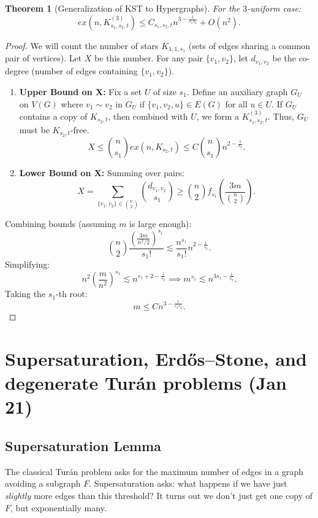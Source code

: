 \documentclass[a4paper]{article}
\newtheorem{thm}{Theorem}[section]
\begin{document}
\begin{thm}[Generalization of KST to Hypergraphs]
    For the $3$-uniform case:
    \[
    ex(n,K_{s_1,s_2,t}^{(3)}) \leq C_{s_1,s_2,t} n^{3-\frac{1}{s_1s_2}} + O(n^2).
    \]
\end{thm}
\begin{proof}
    We will count the number of stars $K_{1,1,s_1}$ (sets of edges sharing a common pair of vertices). Let $X$ be this number. For any pair $\{v_1,v_2\}$, let $d_{v_1,v_2}$ be the co-degree (number of edges containing $\{v_1,v_2\}$).
    
    \begin{enumerate}
        \item \textbf{Upper Bound on X:} Fix a set $U$ of size $s_1$. Define an auxiliary graph $G_U$ on $V(G)$ where $v_1 \sim v_2$ in $G_U$ if $\{v_1, v_2, u\} \in E(G)$ for all $u \in U$. 
        If $G_U$ contains a copy of $K_{s_2,t}$, then combined with $U$, we form a $K_{s_1,s_2,t}^{(3)}$. Thus, $G_U$ must be $K_{s_2,t}$-free.
        \[
        X \leq {n \choose s_1} ex(n,K_{s_2,t}) \leq C {n \choose s_1} n^{2-\frac{1}{s_2}}.
        \]
        
        \item \textbf{Lower Bound on X:} Summing over pairs:
        \[
        X = \sum_{\{v_1,v_2\}\in {V \choose 2}}{d_{v_1,v_2} \choose s_1} \geq {n \choose 2} f_{s_1} \left( \frac{3m}{{n \choose 2}} \right).
        \]
    \end{enumerate}
    Combining bounds (assuming $m$ is large enough):
    \[
    \binom{n}{2} \frac{\left( \frac{3m}{n^2/2} \right)^{s_1}}{s_1!} \lesssim \frac{n^{s_1}}{s_1!} n^{2-\frac{1}{s_2}}.
    \]
    Simplifying:
    \[
    n^2 \left( \frac{m}{n^2} \right)^{s_1} \lesssim n^{s_1 + 2 - \frac{1}{s_2}} \implies m^{s_1} \lesssim n^{3s_1 - \frac{1}{s_2}}.
    \]
    Taking the $s_1$-th root:
    \[
    m \leq C n^{3-\frac{1}{s_1s_2}}.
    \]
\end{proof}
\newpage
\section{Supersaturation, Erd\H{o}s--Stone, and degenerate Tur\'an problems (Jan 21)}

\subsection{Supersaturation Lemma}

The classical Turán problem asks for the maximum number of edges in a graph avoiding a subgraph $F$. Supersaturation asks: what happens if we have just \emph{slightly} more edges than this threshold? It turns out we don't just get one copy of $F$, but exponentially many.
\end{document}
